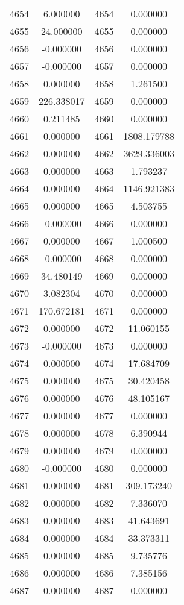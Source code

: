 \documentclass[12pt]{article}
\begin{document}
\begin{longtable}{@{}cccc@{}}
4654 & 6.000000 & 4654 & 0.000000 \\
4655 & 24.000000 & 4655 & 0.000000 \\
4656 & -0.000000 & 4656 & 0.000000 \\
4657 & -0.000000 & 4657 & 0.000000 \\
4658 & 0.000000 & 4658 & 1.261500 \\
4659 & 226.338017 & 4659 & 0.000000 \\
4660 & 0.211485 & 4660 & 0.000000 \\
4661 & 0.000000 & 4661 & 1808.179788 \\
4662 & 0.000000 & 4662 & 3629.336003 \\
4663 & 0.000000 & 4663 & 1.793237 \\
4664 & 0.000000 & 4664 & 1146.921383 \\
4665 & 0.000000 & 4665 & 4.503755 \\
4666 & -0.000000 & 4666 & 0.000000 \\
4667 & 0.000000 & 4667 & 1.000500 \\
4668 & -0.000000 & 4668 & 0.000000 \\
4669 & 34.480149 & 4669 & 0.000000 \\
4670 & 3.082304 & 4670 & 0.000000 \\
4671 & 170.672181 & 4671 & 0.000000 \\
4672 & 0.000000 & 4672 & 11.060155 \\
4673 & -0.000000 & 4673 & 0.000000 \\
4674 & 0.000000 & 4674 & 17.684709 \\
4675 & 0.000000 & 4675 & 30.420458 \\
4676 & 0.000000 & 4676 & 48.105167 \\
4677 & 0.000000 & 4677 & 0.000000 \\
4678 & 0.000000 & 4678 & 6.390944 \\
4679 & 0.000000 & 4679 & 0.000000 \\
4680 & -0.000000 & 4680 & 0.000000 \\
4681 & 0.000000 & 4681 & 309.173240 \\
4682 & 0.000000 & 4682 & 7.336070 \\
4683 & 0.000000 & 4683 & 41.643691 \\
4684 & 0.000000 & 4684 & 33.373311 \\
4685 & 0.000000 & 4685 & 9.735776 \\
4686 & 0.000000 & 4686 & 7.385156 \\
4687 & 0.000000 & 4687 & 0.000000 \\

\end{longtable}
\end{document}
